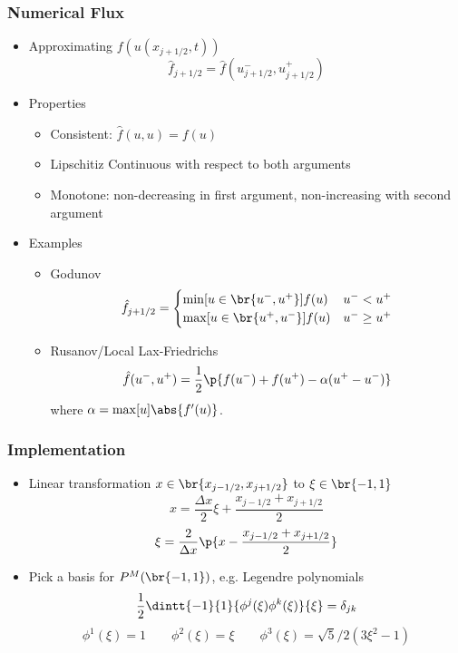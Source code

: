 \documentclass[10pt]{beamer}
\begin{document}
  \begin{frame}
    \frametitle{Numerical Flux}
    \begin{itemize}
      \item Approximating $f(u(x_{j+1/2}, t))$
        \[
          \hat{f}_{j+1/2} = \hat{f}(u_{j+1/2}^-, u_{j+1/2}^+)
        \]

      \item Properties
        \begin{itemize}
          \item Consistent: $\hat{f}(u, u) = f(u)$
          \item Lipschitiz Continuous with respect to both arguments
          \item Monotone: non-decreasing in first argument, non-increasing with second argument
        \end{itemize}

      \item Examples
        \begin{itemize}
          \item Godunov
            \[
              \hat{f}_{j+1/2} =
              \begin{cases}
                \min[u \in \br{u^-, u^+}]{f(u)} & u^- < u^+ \\
                \max[u \in \br{u^+, u^-}]{f(u)} & u^- \ge u^+ \\
              \end{cases}
            \]

          \item Rusanov/Local Lax-Friedrichs
            \[
              \hat{f}(u^-, u^+) = \frac{1}{2}\p{f(u^-) + f(u^+) - \alpha(u^+ - u^-)}
            \]
            where $\alpha = \max[u]{\abs{f'(u)}}$.
        \end{itemize}
    \end{itemize}
  \end{frame}

  \begin{frame}
    \frametitle{Implementation}
    \begin{itemize}
      \item Linear transformation $x \in \br{x_{j-1/2}, x_{j+1/2}}$ to $\xi \in \br{-1, 1}$
        \[
          x = \frac{\Delta x}{2} \xi + \frac{x_{j-1/2} + x_{j+1/2}}{2}
        \]
        \[
          \xi = \frac{2}{\Delta x} \p{x - \frac{x_{j-1/2} + x_{j+1/2}}{2}}
        \]

      \item Pick a basis for $P^M(\br{-1,1})$, e.g. Legendre polynomials
        \[
          \frac{1}{2}\dintt{-1}{1}{\phi^j(\xi) \phi^k(\xi)}{\xi} = \delta_{jk}
        \]
        \[
          \phi^1(\xi) = 1 \qquad \phi^2(\xi) = \xi \qquad \phi^3(\xi) = \sqrt{5}/2(3\xi^2 - 1)
        \]
    \end{itemize}
  \end{frame}
\end{document}
